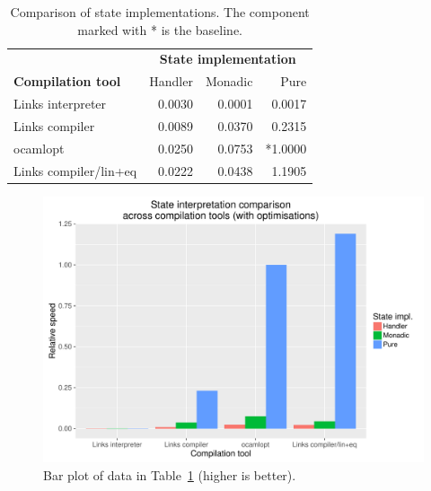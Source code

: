 \documentclass[12pt,mscres,cdtppar,twoside,openright,logo,rightchapter,normalheadings]{infthesis}
\theoremstyle{definition}
\begin{document}
\begin{table}
\centering
\begin{tabular}{| l || r | r | r |}
\cline{2-4}
\multicolumn{1}{c|}{~} & \multicolumn{3}{c|}{\textbf{State implementation}} \\
\cline{1-4}
\multicolumn{1}{|l||}{\textbf{Compilation tool}}  & Handler & Monadic & Pure \\
\hline
  Links interpreter & 0.0030   & 0.0001  & 0.0017 \\
\hline
  Links compiler    & 0.0089   & 0.0370 & 0.2315 \\
\hline
  ocamlopt          & 0.0250   & 0.0753  & *1.0000 \\
\hline
  Links compiler/lin+eq & 0.0222 & 0.0438 & 1.1905 \\
\hline
\end{tabular}
\caption{Comparison of state implementations. The component marked
  with * is the baseline.}\label{tbl:state-all-recovered}
\end{table}
\begin{figure}
\centering
\includegraphics[scale=0.6]{plots/stateAll_recovered.pdf}
\caption{Bar plot of data in Table~\ref{tbl:state-all-recovered} (higher is better).}\label{fig:state-all-recovered}
\end{figure}
\end{document}
